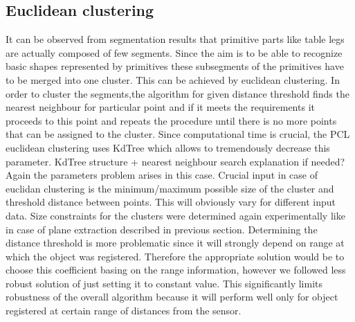 \documentclass[fontsize=12pt]{article}
\begin{document}
\subsection{Euclidean clustering}
\indent It can be observed from segmentation results that primitive parts like table legs are actually composed of few segments. Since the aim is to be able to recognize basic shapes represented by primitives these subsegments of the primitives have to be merged into one cluster. This can be achieved by euclidean clustering.
\newline
\indent In order to cluster the segments,the algorithm for given distance threshold finds the nearest neighbour for particular point and if it meets the requirements it proceeds to this point and repeats the procedure until there is no more points that can be assigned to the cluster. Since computational time is crucial, the PCL euclidean clustering uses KdTree which allows to tremendously decrease this parameter. 
\newline\newline
\indent KdTree structure + nearest neighbour search explanation if needed?
\newline\newline
Again the parameters problem arises in this case. Crucial input in case of euclidan clustering is the minimum/maximum possible size of the cluster and threshold distance between points. This will obviously vary for different input data. Size constraints for the clusters were determined again experimentally like in case of plane extraction described in previous section. Determining the distance threshold is more problematic since it will strongly depend on range at which the object was registered. Therefore the appropriate solution would be to choose this coefficient basing on the range information, however we followed less robust solution of just setting it to constant value. This significantly limits robustness of the overall algorithm because it will perform well only for object registered at certain range of distances from the sensor. 
\end{document}

